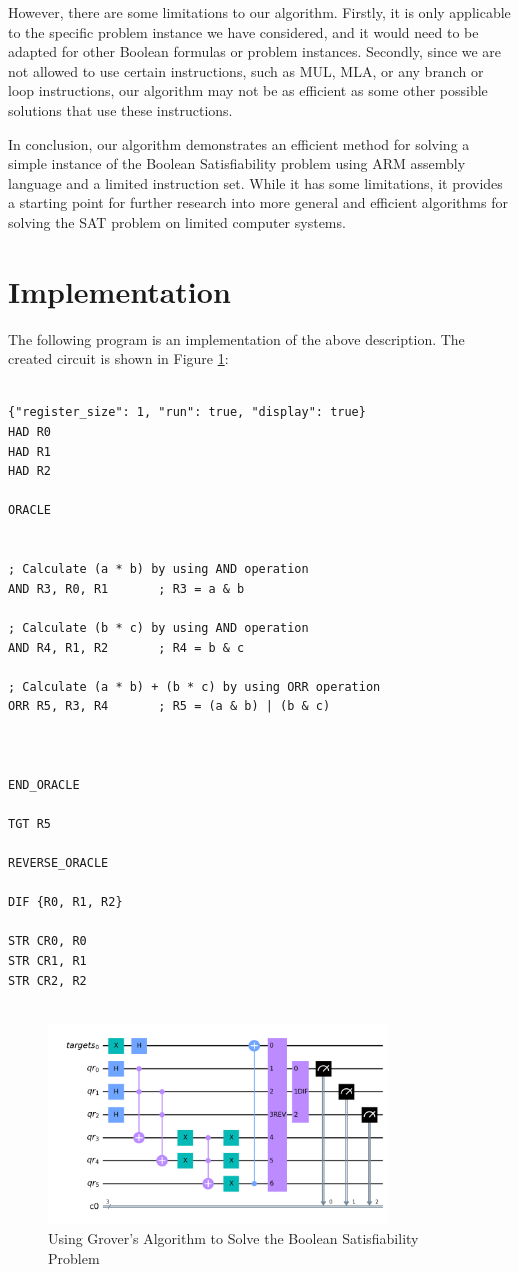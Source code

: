 However, there are some limitations to our algorithm. Firstly, it is only applicable to the specific problem instance we have considered, and it would need to be adapted for other Boolean formulas or problem instances. Secondly, since we are not allowed to use certain instructions, such as MUL, MLA, or any branch or loop instructions, our algorithm may not be as efficient as some other possible solutions that use these instructions.

In conclusion, our algorithm demonstrates an efficient method for solving a simple instance of the Boolean Satisfiability problem using ARM assembly language and a limited instruction set. While it has some limitations, it provides a starting point for further research into more general and efficient algorithms for solving the SAT problem on limited computer systems.



\section{Implementation}

The following program is an implementation of the above description. The created circuit is shown in Figure \ref{fig:Boolean_Satisfiability}:

\begin{lstlisting}

{"register_size": 1, "run": true, "display": true}
HAD R0
HAD R1
HAD R2

ORACLE


; Calculate (a * b) by using AND operation
AND R3, R0, R1       ; R3 = a & b

; Calculate (b * c) by using AND operation
AND R4, R1, R2       ; R4 = b & c

; Calculate (a * b) + (b * c) by using ORR operation
ORR R5, R3, R4       ; R5 = (a & b) | (b & c)



END_ORACLE

TGT R5

REVERSE_ORACLE

DIF {R0, R1, R2}

STR CR0, R0
STR CR1, R1
STR CR2, R2


\end{lstlisting}

\begin{figure}[htp]
    \centering
    \includegraphics[width=9cm]{Figures/Boolean_Satisfiability_circuit.png}
    \caption{Using Grover's Algorithm to Solve the Boolean Satisfiability Problem}
    \label{fig:Boolean_Satisfiability}
\end{figure}

